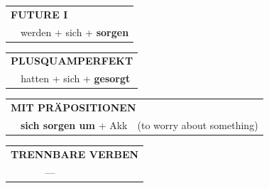 \documentclass[10pt,a4paper]{revtex4-2}
\begin{document}
\begin{verbbox}
\begin{tabular}{rl}
    \multicolumn{2}{l}{\textbf{FUTURE I} }\\
    &werden + sich + \textbf{sorgen}\\
 
  \end{tabular}
\hfill
   \begin{tabular}{rl}
      \multicolumn{2}{l}{\textbf{PLUSQUAMPERFEKT}}\\
    &hatten + sich + \textbf{gesorgt}\\
  \end{tabular}
  
\vspace{10pt}

   \begin{tabular}{lll}
      \multicolumn{3}{l}{\textbf{MIT PRÄPOSITIONEN}}\\
& \textbf{sich sorgen um} + Akk & (to worry about something)
  \end{tabular}
  \hfill
   \begin{tabular}{lll}
      \multicolumn{3}{l}{\textbf{TRENNBARE VERBEN}}\\
& --- & \\
  \end{tabular}
  
  \vspace{-5pt}

\end{verbbox}
\end{document}
